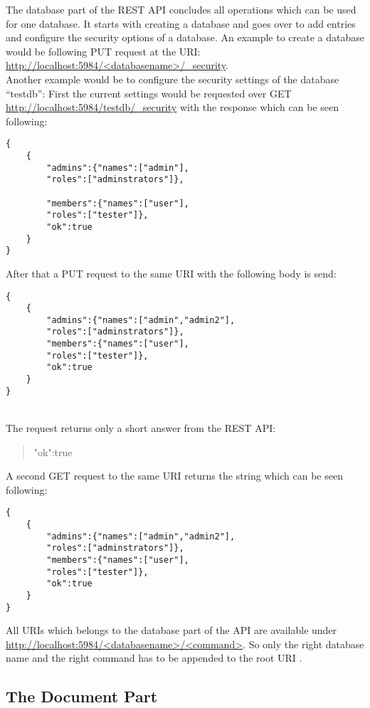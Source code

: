The database part of the REST API concludes all operations which can be used for one database. It starts with creating a database and goes over to add entries and configure the security options of a database.
An example to create a database would be following PUT request at the URI:
\url{http://localhost:5984/<databasename>/_security}. \\
Another example would be to configure the security settings of the database “testdb”:
First the current settings would be requested over GET  \url{http://localhost:5984/testdb/_security} with the response which can be seen following: 
\begin{lstlisting}[frame=single, caption= Example security response]
{
    {
        "admins":{"names":["admin"],
        "roles":["adminstrators"]},
        
        "members":{"names":["user"],
        "roles":["tester"]},
        "ok":true
    }
}
\end{lstlisting} 
\newpage 
After that a PUT request to the same URI with the following body is send:
\begin{lstlisting}[frame=single, caption= Put Answer]
{
    {
        "admins":{"names":["admin","admin2"],
        "roles":["adminstrators"]},
        "members":{"names":["user"],
        "roles":["tester"]},
        "ok":true
    } 
}
\end{lstlisting} \\
The request returns only a short answer from the REST API: 
\begin{quote}{"ok":true} \end{quote}
A second GET request to the same URI returns the string which can be seen following:
\begin{lstlisting}[frame=single, caption=  Get response]
{
    {
        "admins":{"names":["admin","admin2"],
        "roles":["adminstrators"]},
        "members":{"names":["user"],
        "roles":["tester"]},
        "ok":true
    }
}
\end{lstlisting}
All URIs which belongs to the database part of the API are available under  \url{http://localhost:5984/<databasename>/<command>}. So only the right database name and the right command has to be appended to the root URI \parencite{CouchDBRestDatabases}.

\subsection{The Document Part}

